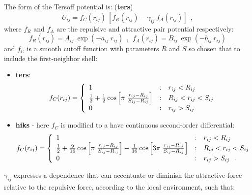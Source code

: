 The form of the Tersoff potential is:  ({\bf ters})
\begin{equation}
U_{ij} = f_{C}(r_{ij})~[f_{R}(r_{ij}) - \gamma_{ij}~f_{A}(r_{ij})]~~,
\end{equation}
where $f_{R}$ and $f_{A}$ are the repulsive and attractive pair
potential respectively:
\begin{equation}
f_{R}(r_{ij}) = A_{ij}~\exp(- a_{ij}~r_{ij})~~,~~
f_{A}(r_{ij}) = B_{ij}~\exp(- b_{ij}~r_{ij})
\end{equation}
and $f_{C}$ is a smooth cutoff function with parameters $R$ and $S$
so chosen that to include the first-neighbor shell:
\begin{itemize}
\item {\bf ters}:
\begin{equation}
f_{C}(r_{ij}) = \left\{ \begin{array} {l@{\quad:\quad}l}
1 & r_{ij} < R_{ij} \\
\frac{1}{2} + \frac{1}{2} \cos \left[\pi~\frac{r_{ij}-R_{ij}}{S_{ij}-R_{ij}}\right]
& R_{ij} < r_{ij} < S_{ij} \\
0 & r_{ij} > S_{ij}
\end{array} \right.
\end{equation}
\item {\bf hiks} - here $f_{C}$ is modified to a have continuous second-order
differential:
\begin{equation}
f_{C}(r_{ij}) = \left\{ \begin{array} {l@{\quad:\quad}l}
1 & r_{ij} < R_{ij} \\
\frac{1}{2} + \frac{9}{16} \cos \left[\pi~\frac{r_{ij}-R_{ij}}{S_{ij}-R_{ij}}\right]
- \frac{1}{16} \cos \left[3 \pi~\frac{r_{ij}-R_{ij}}{S_{ij}-R_{ij}}\right]
& R_{ij} < r_{ij} < S_{ij} \\
0 & r_{ij} > S_{ij}~~.
\end{array} \right.
\end{equation}
\end{itemize}
$\gamma_{ij}$ expresses a dependence that can accentuate or diminish
the attractive force relative to the repulsive force, according to
the local environment, such that:
